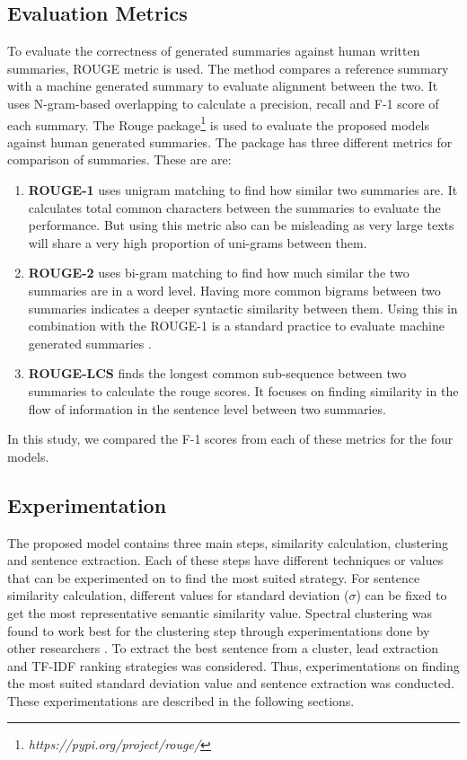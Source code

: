 \documentclass[acmlarge]{acmart}
\begin{document}
\subsection{Evaluation Metrics}\label{subsec:evaluation-metrics}
To evaluate the correctness of generated summaries against human written summaries, ROUGE metric \cite{lin-2004-rouge} is used. The method compares a reference summary with a machine generated summary to evaluate alignment between the two. It uses N-gram-based overlapping to calculate a precision, recall and F-1 score of each summary. The Rouge package\footnote{\textit{https://pypi.org/project/rouge/}} is used to evaluate the proposed models against human generated summaries. The package has three different metrics for comparison of summaries. These are are:
\begin{enumerate}
	\item \textbf{ROUGE-1} uses unigram matching to find how similar two summaries are. It calculates total common characters between the summaries to evaluate the performance. But using this metric also can be misleading as very large texts will share a very high proportion of uni-grams between them.
	\item \textbf{ROUGE-2} uses bi-gram matching to find how much similar the two summaries are in a word level. Having more common bigrams between two summaries indicates a deeper syntactic similarity between them. Using this in combination with the ROUGE-1 is a standard practice to evaluate machine generated summaries \cite{wafaa-2021-summary-comprehensive-review}.
	\item \textbf{ROUGE-LCS} finds the longest common sub-sequence between two summaries to calculate the rouge scores. It focuses on finding similarity in the flow of information in the sentence level between two summaries.
\end{enumerate}
In this study, we compared the F-1 scores from each of these metrics for the four models.

\subsection{Experimentation}\label{subsec:experimentation}
The proposed model contains three main steps, similarity calculation, clustering and sentence extraction. Each of these steps have different techniques or values that can be experimented on to find the most suited strategy. For sentence similarity calculation, different values for standard deviation ($\sigma$) can be fixed to get the most representative semantic similarity value. Spectral clustering was found to work best for the clustering step through experimentations done by other researchers \cite{roychowdhury-etal-2022-spectral-base}. To extract the best sentence from a cluster, lead extraction and TF-IDF ranking strategies was considered. Thus, experimentations on finding the most suited standard deviation value and sentence extraction was conducted. These experimentations are described in the following sections.
\end{document}
